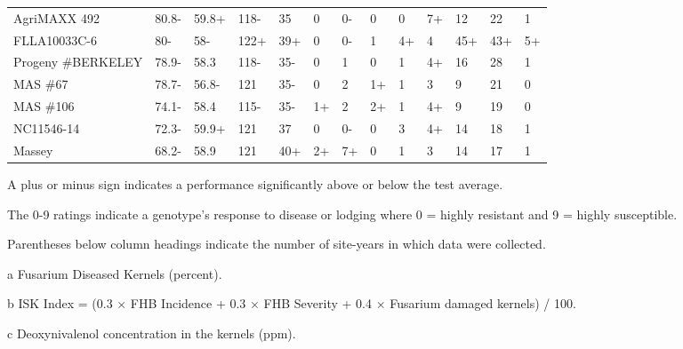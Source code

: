 \documentclass[12pt, letterpaper]{article}
\begin{document}
\begin{landscape}
\begin{ThreePartTable}
\begin{longtable}{lllllllllllll}
  AgriMAXX 492 & 80.8- & 59.8+ & 118- & 35 & 0 & 0- & 0 & 0 & 7+ & 12 & 22 & 1 \\ 
  FLLA10033C-6 & 80- & 58- & 122+ & 39+ & 0 & 0- & 1 & 4+ & 4 & 45+ & 43+ & 5+ \\ 
  Progeny \#BERKELEY & 78.9- & 58.3 & 118- & 35- & 0 & 1 & 0 & 1 & 4+ & 16 & 28 & 1 \\ 
  MAS \#67 & 78.7- & 56.8- & 121 & 35- & 0 & 2 & 1+ & 1 & 3 & 9 & 21 & 0 \\ 
  MAS \#106 & 74.1- & 58.4 & 115- & 35- & 1+ & 2 & 2+ & 1 & 4+ & 9 & 19 & 0 \\ 
  NC11546-14 & 72.3- & 59.9+ & 121 & 37 & 0 & 0- & 0 & 3 & 4+ & 14 & 18 & 1 \\ 
  Massey & 68.2- & 58.9 & 121 & 40+ & 2+ & 7+ & 0 & 1 & 3 & 14 & 17 & 1 \\ 
\end{longtable}
\end{ThreePartTable}

\newpage


\begin{ThreePartTable}
\begin{TableNotes}
\footnotesize
\item A plus or minus sign indicates a performance significantly above or below the test average.
\item The 0-9 ratings indicate a genotype's response to disease or lodging where 0 = highly resistant and 9 = highly susceptible.
\item Parentheses below column headings indicate the number of site-years in which data were collected.
\item [a] Fusarium Diseased Kernels (percent).
\item [b] ISK Index = (0.3 $\times$ FHB Incidence + 0.3 $\times$ FHB Severity + 0.4 $\times$ Fusarium damaged kernels) / 100.
\item [c] Deoxynivalenol concentration in the kernels (ppm).
\end{TableNotes}


\end{ThreePartTable}
\end{landscape}
\end{document}
